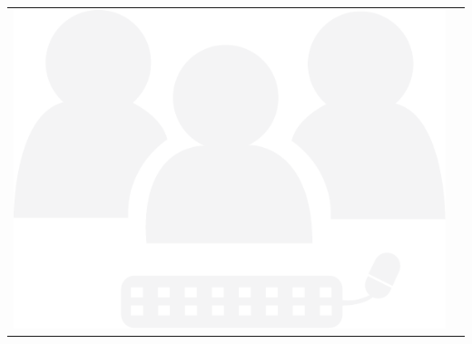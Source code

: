 {{\scriptsize
\begin{multicols}{2}
\begin{center}
\begin{lscshdrbox}
\begin{tabu}{X[1,l,m] X[2,l,m]}
\vspace{0pt}
\includegraphics[scale=0.15]{figures/component-support.pdf}
&
\vspace{0pt}
\textcolor{white}{\textbf{\selectfont {SUPPORT}}}
\end{tabu}
\end{lscshdrbox}
\end{center}

\columnbreak


\end{multicols}}}
